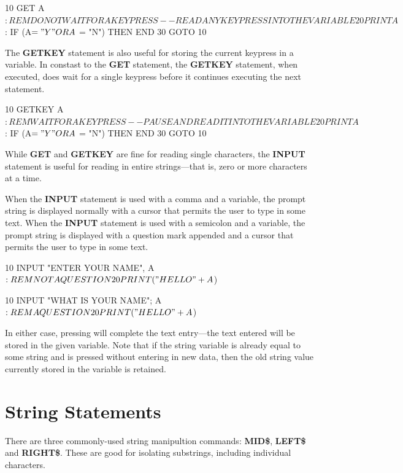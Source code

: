 \begin{screenoutput}
10 GET A$: REM DO NOT WAIT FOR A KEYPRESS--READ ANY KEYPRESS INTO THE VARIABLE
20 PRINT A$: IF (A$ = "Y" OR A$ = "N") THEN END
30 GOTO 10
\end{screenoutput}

The {\bf GETKEY} statement is also useful for storing the current keypress in a variable. In constast to the {\bf GET} statement, the {\bf GETKEY} statement, when executed, does wait for a single keypress before it continues executing the next statement.

\begin{screenoutput}
10 GETKEY A$: REM WAIT FOR A KEYPRESS--PAUSE AND READ IT INTO THE VARIABLE
20 PRINT A$: IF (A$ = "Y" OR A$ = "N") THEN END
30 GOTO 10
\end{screenoutput}

While {\bf GET} and {\bf GETKEY} are fine for reading single characters, the {\bf INPUT} statement is useful for reading in entire strings---that is, zero or more characters at a time.

When the {\bf INPUT} statement is used with a comma and a variable, the prompt string is displayed normally with a cursor that permits the user to type in some text. When the {\bf INPUT} statement is used with a semicolon and a variable, the prompt string is displayed with a question mark appended and a cursor that permits the user to type in some text.

\begin{screenoutput}
10 INPUT "ENTER YOUR NAME", A$: REM NOT A QUESTION
20 PRINT ("HELLO " + A$)
\end{screenoutput}

\begin{screenoutput}
10 INPUT "WHAT IS YOUR NAME"; A$: REM A QUESTION
20 PRINT ("HELLO " + A$)
\end{screenoutput}

In either case, pressing  will complete the text entry---the text entered will be stored in the given variable. Note that if the string variable is already equal to some string and  is pressed without entering in new data, then the old string value currently stored in the variable is retained.

\section{String Statements}
There are three commonly-used string manipultion commands: {\bf MID\$}, {\bf LEFT\$} and {\bf RIGHT\$}. These are good for isolating substrings, including individual characters.

